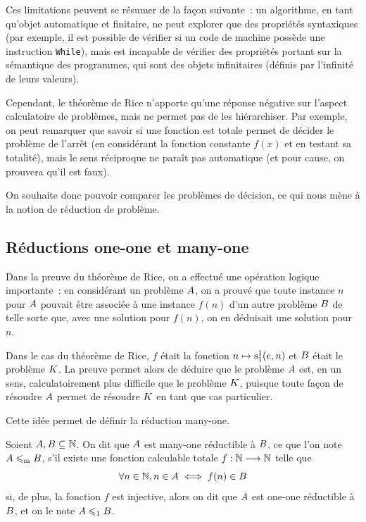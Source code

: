 Ces limitations peuvent se résumer de la façon suivante~: un algorithme, en
tant qu'objet automatique et finitaire, ne peut explorer que des propriétés
syntaxiques (par exemple, il est possible de vérifier si un code de machine
possède une instruction \texttt{While}), mais est incapable de vérifier des
propriétés portant sur la sémantique des programmes, qui sont des objets
infinitaires (définis par l'infinité de leurs valeurs).

Cependant, le théorème de Rice n'apporte qu'une réponse négative sur l'aspect
calculatoire de problèmes, mais ne permet pas de les hiérarchiser. Par exemple,
on peut remarquer que savoir si une fonction est totale permet de décider
le problème de l'arrêt (en considérant la fonction constante $f(x)$ et en
testant sa totalité), mais le sens réciproque ne paraît pas automatique (et
pour cause, on prouvera qu'il est faux).

On souhaite donc pouvoir comparer les problèmes de décision, ce qui nous mène à
la notion de réduction de problème.

\subsection{Réductions one-one et many-one}

Dans la preuve du théorème de Rice, on a effectué une opération logique
importante~: en considérant un problème $A$, on a prouvé que toute instance
$n$ pour $A$ pouvait être associée à une instance $f(n)$ d'un autre
problème $B$ de telle sorte que, avec une solution pour $f(n)$, on en
déduisait une solution pour $n$.

Dans le cas du théorème de Rice, $f$ était la fonction $n\mapsto\mathrm{s}_{1}^{1}(e,n)$
et $B$ était le problème $K$. La preuve permet alors de déduire que le
problème $A$ est, en un sens, calculatoirement plus difficile que le
problème $K$, puisque toute façon de résoudre $A$ permet de résoudre
$K$ en tant que cas particulier.

Cette idée permet de définir la réduction many-one.

\begin{definition}
  Soient $A,B \subseteq \mathbb N$. On dit que $A$ est many-one
  réductible à $B$, ce que l'on note $A\leqslant_{\mathrm{m}} B$, s'il
  existe une fonction calculable totale $f : \displaystyle \mathbb N \longrightarrow \mathbb N$ telle que
  \[\forall n \in \mathbb N, n \in A \iff f(n) \in B\]
  si, de plus, la fonction $f$ est injective, alors on dit que $A$ est
  one-one réductible à $B$, et on le note $A \leqslant_{1} B$.
  \index[notation]{$\oneOne$}
  \index[notation]{$\manyOne$}
\end{definition}

